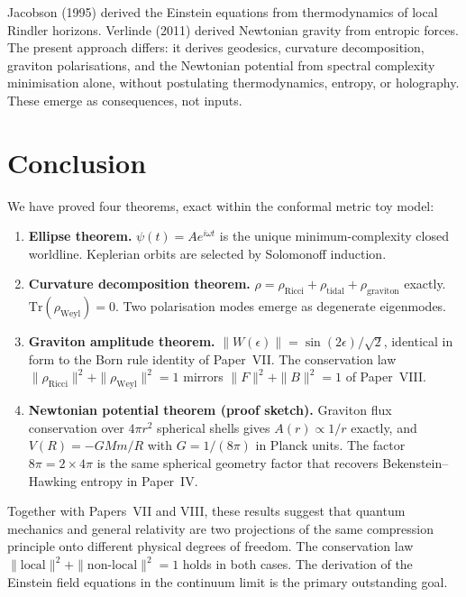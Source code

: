 \documentclass[11pt]{article}
\begin{document}
Jacobson (1995) derived the Einstein equations from thermodynamics of
local Rindler horizons.
Verlinde (2011) derived Newtonian gravity from entropic forces.
The present approach differs: it derives geodesics, curvature
decomposition, graviton polarisations, and the Newtonian potential
from spectral complexity minimisation alone, without postulating
thermodynamics, entropy, or holography.
These emerge as consequences, not inputs.

\section{Conclusion}
\label{sec:conclusion}

We have proved four theorems, exact within the conformal metric
toy model:

\begin{enumerate}
  \item \textbf{Ellipse theorem.}
    $\psi(t) = Ae^{i\omega t}$ is the unique minimum-complexity closed
    worldline.
    Keplerian orbits are selected by Solomonoff induction.

  \item \textbf{Curvature decomposition theorem.}
    $\rho = \rho_{\mathrm{Ricci}} + \rho_{\mathrm{tidal}} +
    \rho_{\mathrm{graviton}}$ exactly.
    $\mathrm{Tr}(\rho_{\mathrm{Weyl}}) = 0$.
    Two polarisation modes emerge as degenerate eigenmodes.

  \item \textbf{Graviton amplitude theorem.}
    $\|W(\epsilon)\| = \sin(2\epsilon)/\sqrt{2}$, identical in form to
    the Born rule identity of Paper~VII.
    The conservation law $\|\rho_{\mathrm{Ricci}}\|^2 +
    \|\rho_{\mathrm{Weyl}}\|^2 = 1$ mirrors $\|F\|^2 + \|B\|^2 = 1$
    of Paper~VIII.

  \item \textbf{Newtonian potential theorem (proof sketch).}
    Graviton flux conservation over $4\pi r^2$ spherical shells gives
    $A(r) \propto 1/r$ exactly, and $V(R) = -GMm/R$ with
    $G = 1/(8\pi)$ in Planck units.
    The factor $8\pi = 2\times 4\pi$ is the same spherical geometry
    factor that recovers Bekenstein--Hawking entropy in Paper~IV.
\end{enumerate}

Together with Papers~VII and VIII, these results suggest that quantum
mechanics and general relativity are two projections of the same
compression principle onto different physical degrees of freedom.
The conservation law $\|\text{local}\|^2 + \|\text{non-local}\|^2 = 1$
holds in both cases.
The derivation of the Einstein field equations in the continuum limit
is the primary outstanding goal.
\end{document}
